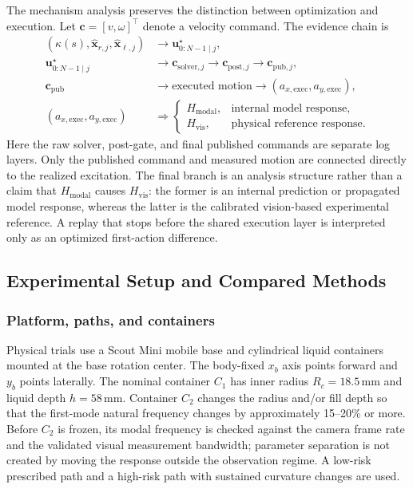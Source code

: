 The mechanism analysis preserves the distinction between optimization and
execution. Let $\bm c=[v,\omega]^\top$ denote a velocity command. The evidence
chain is
\[
\begin{aligned}
(\kappa(s),\hat{\bm{x}}_{r,j},\hat{\bm{x}}_{\ell,j})
&\rightarrow \bm{u}^{\star}_{0:N-1\mid j},\\
\bm{u}^{\star}_{0:N-1\mid j}
&\rightarrow \bm c_{\mathrm{solver},j}
\rightarrow \bm c_{\mathrm{post},j}
\rightarrow \bm c_{\mathrm{pub},j},\\
\bm c_{\mathrm{pub}}
&\rightarrow \text{executed motion}
\rightarrow (a_{x,\mathrm{exec}},a_{y,\mathrm{exec}}),\\[-1mm]
(a_{x,\mathrm{exec}},a_{y,\mathrm{exec}})
&\Rightarrow
\begin{cases}
H_{\mathrm{modal}}, & \text{internal model response},\\
H_{\mathrm{vis}}, & \text{physical reference response}.
\end{cases}
\end{aligned}
\]
Here the raw solver, post-gate, and final published commands are separate log
layers. Only the published command and measured motion are connected directly
to the realized excitation. The final branch is an analysis structure rather
than a claim that $H_{\mathrm{modal}}$ causes $H_{\mathrm{vis}}$: the former is
an internal prediction or propagated model response, whereas the latter is the
calibrated vision-based experimental reference. A replay that stops before the
shared execution layer is interpreted only as an optimized first-action
difference.

\subsection{Experimental Setup and Compared Methods}

\subsubsection{Platform, paths, and containers}

Physical trials use a Scout Mini mobile base and cylindrical liquid containers
mounted at the base rotation center. The body-fixed $x_b$ axis points forward
and $y_b$ points laterally. The nominal container $C_1$ has inner radius
$R_c=18.5\,\mathrm{mm}$ and liquid depth $h=58\,\mathrm{mm}$. Container $C_2$
changes the radius and/or fill depth so that the first-mode natural frequency
changes by approximately 15--20\% or more. Before $C_2$ is frozen, its modal
frequency is checked against the camera frame rate and the validated visual
measurement bandwidth; parameter separation is not created by moving the
response outside the observation regime. A low-risk prescribed path and a
high-risk path with sustained curvature changes are used.

